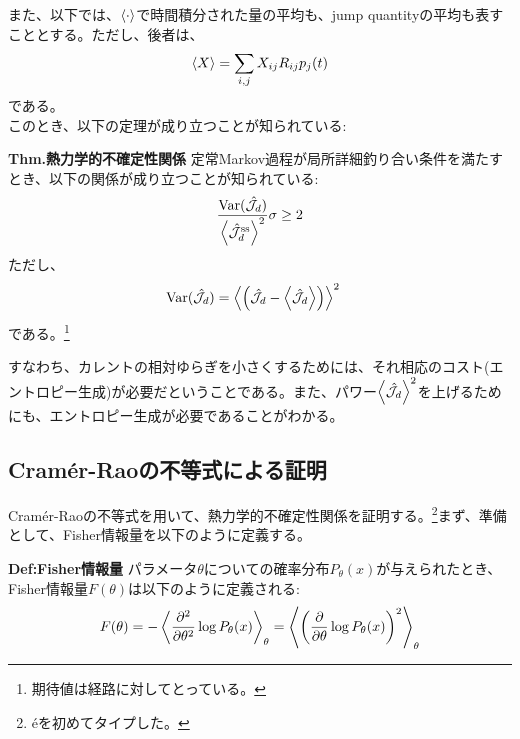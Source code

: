 \documentclass[a4paper,11pt]{jsarticle}
\numberwithin{equation}{section}
\begin{document}
また、以下では、$\ev{\cdot}$で時間積分された量の平均も、jump quantityの平均も表すこととする。ただし、後者は、
\begin{align}
    \ev{X} = \sum_{i,j} X_{ij} R_{ij}p_j(t)
\end{align}
である。\\

このとき、以下の定理が成り立つことが知られている:

\begin{itembox}[l]{\textbf{Thm.熱力学的不確定性関係}}
    定常Markov過程が局所詳細釣り合い条件を満たすとき、以下の関係が成り立つことが知られている:
    \begin{align}
        \frac{\text{Var}(\hat{\mathcal{J}}_d)}{\ev{\hat{\mathcal{J}}_d^{\text{ss}}}^2} \sigma \geq 2
    \end{align}
    ただし、
    \begin{align}
        \text{Var}(\hat{\mathcal{J}}_d) &= \ev{\qty(\hat{\mathcal{J}}_d -\ev{\hat{\mathcal{J}_d}})}^2
    \end{align}
    である。\footnote{期待値は経路に対してとっている。}
\end{itembox}
すなわち、カレントの相対ゆらぎを小さくするためには、それ相応のコスト(エントロピー生成)が必要だということである。また、パワー$\ev{\hat{\mathcal{J}}_d}^2$を上げるためにも、エントロピー生成が必要であることがわかる。\\

\subsection{Cram\'er-Raoの不等式による証明}
Cram\'er-Raoの不等式を用いて、熱力学的不確定性関係を証明する。\footnote{\'eを初めてタイプした。}まず、準備として、Fisher情報量を以下のように定義する。
\begin{itembox}[l]{\textbf{Def:Fisher情報量}}
    パラメータ$\theta$についての確率分布$P_{\theta}(x)$が与えられたとき、Fisher情報量$F(\theta)$は以下のように定義される:
    \begin{align}
        F(\theta) = -\ev{\pdv[2]{\theta} \log P_{\theta}(x)}_{\theta} =\ev{\qty(\pdv{\theta} \log P_{\theta}(x))^2}_{\theta}
    \end{align}
\end{itembox}
\end{document}
